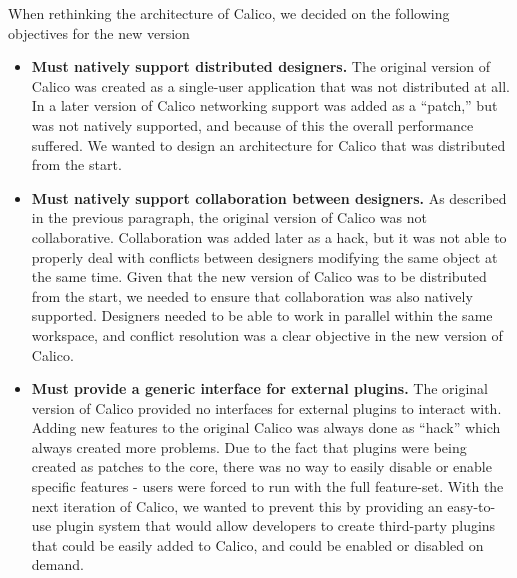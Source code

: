 When rethinking the architecture of Calico, we decided on the following objectives for the new version
\begin{itemize}\itemsep1pt
\item 
\textbf{Must natively support distributed designers.}
\newline
The original version of Calico was created as a single-user application that was not distributed at all. In a later version of Calico networking support was added as a ``patch,'' but was not natively supported, and because of this the overall performance suffered.
We wanted to design an architecture for Calico that was distributed from the start.

\item
\textbf{Must natively support collaboration between designers.}
\newline
As described in the previous paragraph, the original version of Calico was not collaborative. 
Collaboration was added later as a hack, but it was not able to properly deal with conflicts between designers modifying the same object at the same time. 
Given that the new version of Calico was to be distributed from the start, we needed to ensure that collaboration was also natively supported.
Designers needed to be able to work in parallel within the same workspace, and conflict resolution was a clear objective in the new version of Calico. 

\item
\textbf{Must provide a generic interface for external plugins.}
\newline
The original version of Calico provided no interfaces for external plugins to interact with. 
Adding new features to the original Calico was always done as ``hack'' which always created more problems.
Due to the fact that plugins were being created as patches to the core, there was no way to easily disable or enable specific features - users were forced to run with the full feature-set. 
With the next iteration of Calico, we wanted to prevent this by providing an easy-to-use plugin system that would allow developers to create third-party plugins that could be easily added to Calico, and could be enabled or disabled on demand.

\end{itemize}


